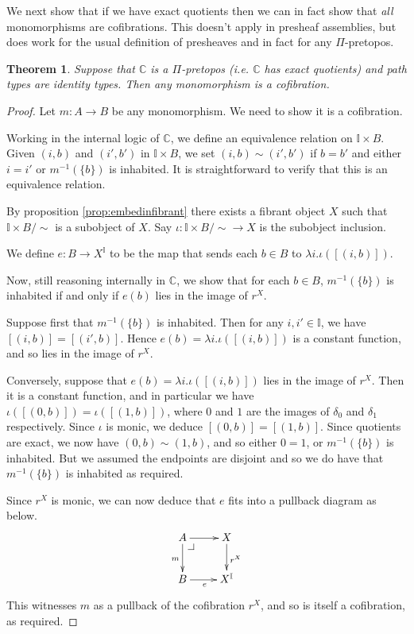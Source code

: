 \documentclass[a4paper]{amsart}
\makeatletter
\newtheorem{theorem}{Theorem}[section]
\theoremstyle{definition}
\newcommand{\pullbackcorner}[1][dr]{\save*!/#1-1.2pc/#1:(-1,1)@^{|-}\restore}
\newcommand{\cat}[1]{\mathbb{#1}}
\newcommand{\catc}{\cat{C}}
\newcommand{\intv}{\mathbb{I}}
\makeatother
\begin{document}
We next show that if we have exact quotients then we can in fact show
that \emph{all} monomorphisms are cofibrations. This doesn't apply in
presheaf assemblies, but does work for the usual definition of
presheaves and in fact for any $\Pi$-pretopos.

\begin{theorem}
  \label{thm:allmonoscofs}
  Suppose that $\catc$ is a $\Pi$-pretopos (i.e. $\catc$ has exact
  quotients) and path types are identity types. Then any monomorphism
  is a cofibration.
\end{theorem}

\begin{proof}
  Let $m \colon A \to B$ be any monomorphism. We need to
  show it is a cofibration.

  Working in the internal logic of $\catc$, we define an equivalence
  relation on $\intv \times B$. Given $(i, b)$ and $(i', b')$ in
  $\intv \times B$, we set $(i, b) \sim (i', b')$ if $b = b'$ and
  either $i = i'$ or $m^{-1}(\{b\})$ is inhabited. It is
  straightforward to verify that this is an equivalence relation.

  By proposition \ref{prop:embedinfibrant} there exists a fibrant
  object $X$ such that $\intv \times B / {\sim}$ is a subobject of
  $X$. Say $\iota \colon \intv \times B / {\sim} \to X$ is the
  subobject inclusion.

  We define $e \colon B \to X^\intv$ to be the map that sends each $b
  \in B$ to $\lambda i.\iota([(i, b)])$.

  Now, still reasoning internally in $\catc$, we show that for each $b
  \in B$, $m^{-1}(\{b\})$ is inhabited if and only if $e(b)$ lies in
  the image of $r^X$.

  Suppose first that $m^{-1}(\{b\})$ is inhabited. Then for any
  $i, i' \in \intv$, we have $[(i, b)] = [(i', b)]$. Hence
  $e(b) = \lambda i.\iota([(i, b)])$ is a constant function, and so
  lies in the image of $r^X$.

  Conversely, suppose that $e(b) = \lambda i.\iota([(i, b)])$ lies in
  the image of $r^X$. Then it is a constant function, and in
  particular we have $\iota([(0, b)]) = \iota([(1, b)])$, where $0$
  and $1$ are the images of $\delta_0$ and $\delta_1$
  respectively. Since $\iota$ is monic, we deduce $[(0, b)] = [(1,
  b)]$. Since quotients are exact, we now have $(0, b) \sim (1, b)$,
  and so either $0 = 1$, or $m^{-1}(\{b\})$ is inhabited. But we
  assumed the endpoints are disjoint and so we do have that
  $m^{-1}(\{b\})$ is inhabited as required.

  Since $r^X$ is monic, we can now deduce that $e$ fits into a
  pullback diagram as below.
  \begin{equation*}
    \xymatrix{ A \ar[d]_m \ar[r] \pullbackcorner & X \ar[d]^{r^X} \\
      B \ar[r]_e & X^\intv}
  \end{equation*}
  This witnesses $m$ as a pullback of the cofibration $r^X$, and so is
  itself a cofibration, as required.
\end{proof}
\end{document}
